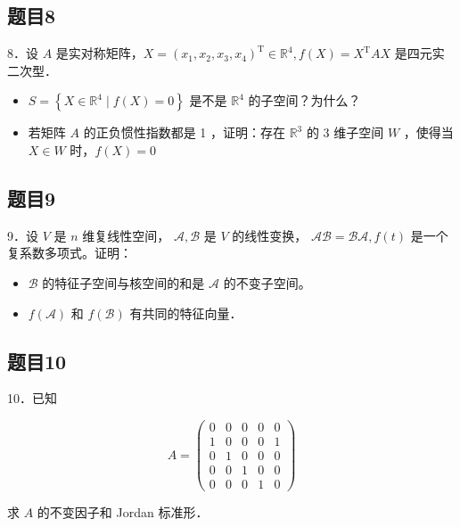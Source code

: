 \documentclass{article}
\begin{document}
\subsection{题目8}
8．设 \(A\) 是实对称矩阵，\(X=\left(x_{1}, x_{2}, x_{3}, x_{4}\right)^{\mathrm{T}} \in \mathbb{R}^{4}, f(X)=X^{\mathrm{T}} A X\) 是四元实二次型．

\begin{itemize}
  \item[（1）] \(S=\left\{X \in \mathbb{R}^{4} \mid f(X)=0\right\}\) 是不是 \(\mathbb{R}^{4}\) 的子空间？为什么？
  \item[（2）] 若矩阵 \(A\) 的正负惯性指数都是 1 ，证明：存在 \(\mathbb{R}^{3}\) 的 3 维子空间 \(W\) ，使得当 \(X \in W\) 时，\(f(X)=0\)
\end{itemize}

\subsection{题目9}
9．设 \(V\) 是 \(n\) 维复线性空间， \(\mathcal{A}, \mathcal{B}\) 是 \(V\) 的线性变换， \(\mathcal{A} \mathcal{B}=\mathcal{B} \mathcal{A}, f(t)\) 是一个复系数多项式。证明：

\begin{itemize}
  \item[（1）] \(\mathcal{B}\) 的特征子空间与核空间的和是 \(\mathcal{A}\) 的不变子空间。
  \item[（2）] \(f(\mathcal{A})\) 和 \(f(\mathcal{B})\) 有共同的特征向量．
\end{itemize}

\subsection{题目10}
10．已知

\[
A=\left(\begin{array}{lllll}
0 & 0 & 0 & 0 & 0 \\
1 & 0 & 0 & 0 & 1 \\
0 & 1 & 0 & 0 & 0 \\
0 & 0 & 1 & 0 & 0 \\
0 & 0 & 0 & 1 & 0
\end{array}\right)
\]

求 \(A\) 的不变因子和 Jordan 标准形．
\end{document}

